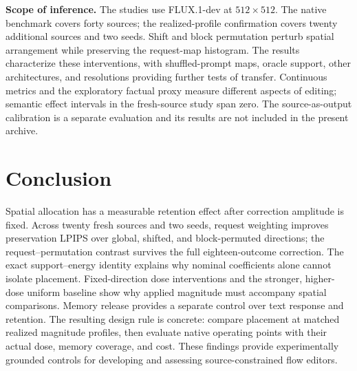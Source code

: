 \documentclass[conference]{IEEEtran}
\begin{document}
\textbf{Scope of inference.} The studies use FLUX.1-dev at $512\times512$. The native benchmark covers forty sources; the realized-profile confirmation covers twenty additional sources and two seeds. Shift and block permutation perturb spatial arrangement while preserving the request-map histogram. The results characterize these interventions, with shuffled-prompt maps, oracle support, other architectures, and resolutions providing further tests of transfer. Continuous metrics and the exploratory factual proxy measure different aspects of editing; semantic effect intervals in the fresh-source study span zero. The source-as-output calibration is a separate evaluation and its results are not included in the present archive.

\section{Conclusion}
Spatial allocation has a measurable retention effect after correction amplitude is fixed. Across twenty fresh sources and two seeds, request weighting improves preservation LPIPS over global, shifted, and block-permuted directions; the request--permutation contrast survives the full eighteen-outcome correction. The exact support--energy identity explains why nominal coefficients alone cannot isolate placement. Fixed-direction dose interventions and the stronger, higher-dose uniform baseline show why applied magnitude must accompany spatial comparisons. Memory release provides a separate control over text response and retention. The resulting design rule is concrete: compare placement at matched realized magnitude profiles, then evaluate native operating points with their actual dose, memory coverage, and cost. These findings provide experimentally grounded controls for developing and assessing source-constrained flow editors.
\end{document}
